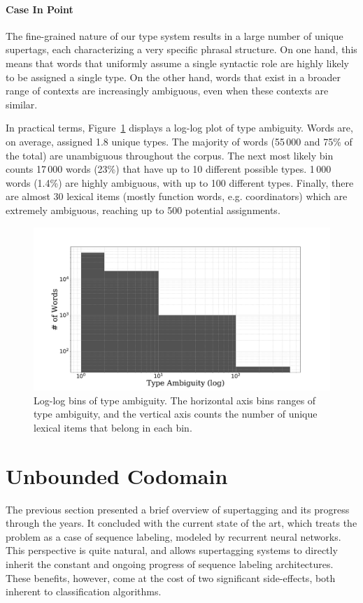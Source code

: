 \paragraph{Case In Point}
The fine-grained nature of our type system results in a large number of unique supertags, each characterizing a very specific phrasal structure.
On one hand, this means that words that uniformly assume a single syntactic role are highly likely to be assigned a single type.
On the other hand, words that exist in a broader range of contexts are increasingly ambiguous, even when these contexts are similar.

In practical terms, Figure~\ref{fig:type_ambiguity} displays a log-log plot of type ambiguity. 
Words are, on average, assigned 1.8 unique types.
The majority of words (55\,000 and 75\% of the total) are unambiguous throughout the corpus.
The next most likely bin counts 17\,000 words (23\%) that have up to 10 different possible types. 
1\,000 words (1.4\%) are highly ambiguous, with up to 100 different types.
Finally, there are almost 30 lexical items (mostly function words, e.g. coordinators) which are extremely ambiguous, reaching up to 500 potential assignments.



\begin{figure}
    \centering
    \includegraphics[scale=0.29]{Figures/ambiguity.pdf}
    \caption[Extracted Type Ambiguity]{Log-log bins of type ambiguity. The horizontal axis bins ranges of type ambiguity, and the vertical axis counts the number of unique lexical items that belong in each bin.}
    \label{fig:type_ambiguity}
\end{figure}

\section{Unbounded Codomain}
The previous section presented a brief overview of supertagging and its progress through the years.
It concluded with the current state of the art, which treats the problem as a case of sequence labeling, modeled by recurrent neural networks.
This perspective is quite natural, and allows supertagging systems to directly inherit the constant and ongoing progress of sequence labeling architectures.
These benefits, however, come at the cost of two significant side-effects, both inherent to classification algorithms.

